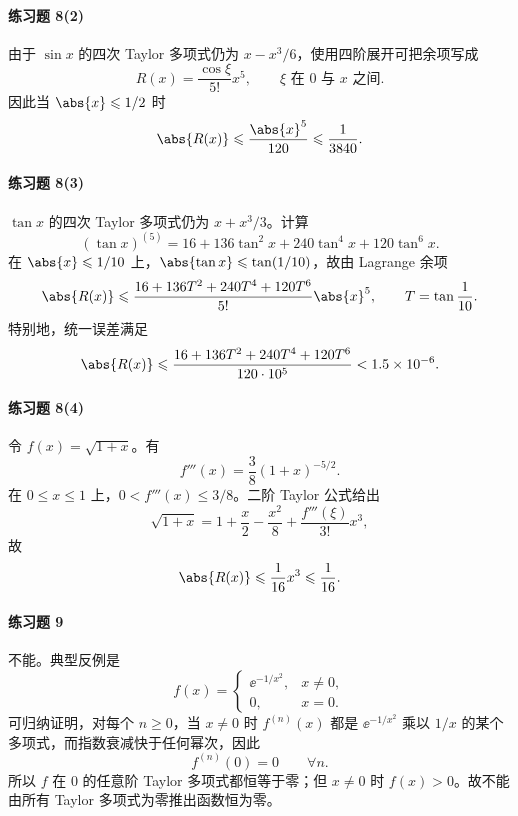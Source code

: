 \paragraph{练习题 8(2)}
\begin{xsolution}
由于 $\sin x$ 的四次 Taylor 多项式仍为 $x-x^3/6$，使用四阶展开可把余项写成
\[
  R(x)=\frac{\cos\xi}{5!}x^5,
  \qquad \xi\text{ 在 }0\text{ 与 }x\text{ 之间}.
\]
因此当 $\abs{x}\leqslant1/2$ 时
\[
  \abs{R(x)}\leqslant\frac{\abs{x}^5}{120}
  \leqslant\frac1{3840}.
\]
\end{xsolution}

\paragraph{练习题 8(3)}
\begin{xsolution}
$\tan x$ 的四次 Taylor 多项式仍为 $x+x^3/3$。计算
\[
  (\tan x)^{(5)}
  =16+136\tan^2x+240\tan^4x+120\tan^6x.
\]
在 $\abs{x}\leqslant1/10$ 上，$\abs{\tan x}\leqslant\tan(1/10)$，故由 Lagrange 余项
\[
  \abs{R(x)}
  \leqslant
  \frac{16+136T^2+240T^4+120T^6}{5!}\abs{x}^5,
  \qquad T=\tan\frac1{10}.
\]
特别地，统一误差满足
\[
  \abs{R(x)}
  \leqslant
  \frac{16+136T^2+240T^4+120T^6}{120\cdot10^5}
  <1.5\times10^{-6}.
\]
\end{xsolution}

\paragraph{练习题 8(4)}
\begin{xsolution}
令 $f(x)=\sqrt{1+x}$。有
\[
  f'''(x)=\frac{3}{8}(1+x)^{-5/2}.
\]
在 $0\leqslant x\leqslant1$ 上，$0<f'''(x)\leqslant3/8$。二阶 Taylor 公式给出
\[
  \sqrt{1+x}=1+\frac x2-\frac{x^2}{8}
  +\frac{f'''(\xi)}{3!}x^3,
\]
故
\[
  \abs{R(x)}\leqslant\frac{1}{16}x^3\leqslant\frac1{16}.
\]
\end{xsolution}

\paragraph{练习题 9}
\begin{xsolution}
不能。典型反例是
\[
  f(x)=
  \begin{cases}
    \ee^{-1/x^2},&x\neq0,\\
    0,&x=0.
  \end{cases}
\]
可归纳证明，对每个 $n\geqslant0$，当 $x\neq0$ 时 $f^{(n)}(x)$ 都是 $\ee^{-1/x^2}$ 乘以 $1/x$ 的某个多项式，而指数衰减快于任何幂次，因此
\[
  f^{(n)}(0)=0\qquad\forall n.
\]
所以 $f$ 在 $0$ 的任意阶 Taylor 多项式都恒等于零；但 $x\neq0$ 时 $f(x)>0$。故不能由所有 Taylor 多项式为零推出函数恒为零。
\end{xsolution}

